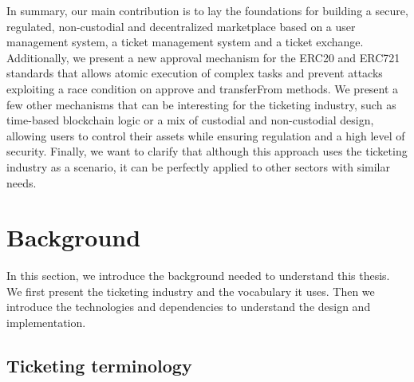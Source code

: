 \documentclass[a4paper,11pt,oneside]{report}
\begin{document}
In summary, our main contribution is to lay the foundations for building a secure, regulated, non-custodial and decentralized marketplace based on a user management system, a ticket management system and a ticket exchange. Additionally, we present a new approval mechanism for the ERC20 and ERC721 standards that allows atomic execution of complex tasks and prevent attacks exploiting a race condition on approve and transferFrom methods. We present a few other mechanisms that can be interesting for the ticketing industry, such as time-based blockchain logic or a mix of custodial and non-custodial design, allowing users to control their assets while ensuring regulation and a high level of security. Finally, we want to clarify that although this approach uses the ticketing industry as a scenario, it can be perfectly applied to other sectors with similar needs.

\chapter{Background}
In this section, we introduce the background needed to understand this thesis. We first present the ticketing industry and the vocabulary it uses. Then we introduce the technologies and dependencies to understand the design and implementation.

\section{Ticketing terminology}
\label{sec:ticketing_terminology}
\end{document}
